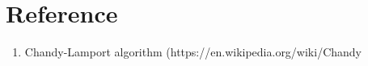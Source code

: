 \section{Reference}
\begin{enumerate}
    \item Chandy-Lamport algorithm (https://en.wikipedia.org/wiki/Chandy%
\end{enumerate}